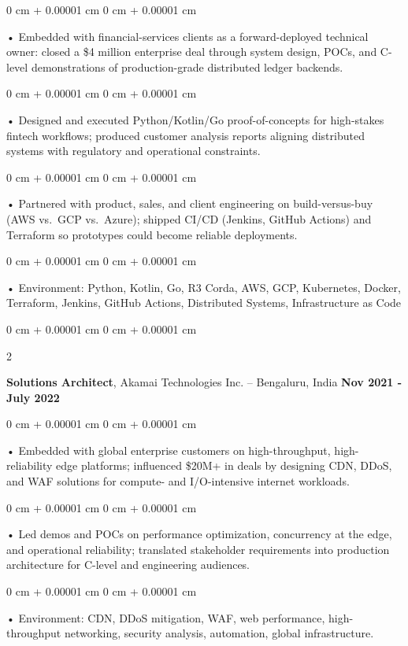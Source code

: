 \documentclass[10pt, letterpaper]{article}
\newenvironment{onecolentry}{
    \begin{adjustwidth}{
        0 cm + 0.00001 cm
    }{
        0 cm + 0.00001 cm
    }
}{
    \end{adjustwidth}
} %
\newenvironment{twocolentry}[2][]{
    \onecolentry
    \def\secondColumn{#2}
    \setcolumnwidth{\fill, 4.5 cm}
    \begin{paracol}{2}
}{
    \switchcolumn \raggedleft \secondColumn
    \end{paracol}
    \endonecolentry
} %
\begin{document}
        \begin{onecolentry}
             • Embedded with financial-services clients as a forward-deployed technical owner: closed a \$4 million enterprise deal through system design, POCs, and C-level demonstrations of production-grade distributed ledger backends.
        \end{onecolentry}
        \begin{onecolentry}
             • Designed and executed Python/Kotlin/Go proof-of-concepts for high-stakes fintech workflows; produced customer analysis reports aligning distributed systems with regulatory and operational constraints.
        \end{onecolentry}
        \begin{onecolentry}
             • Partnered with product, sales, and client engineering on build-versus-buy (AWS vs.\ GCP vs.\ Azure); shipped CI/CD (Jenkins, GitHub Actions) and Terraform so prototypes could become reliable deployments.
        \end{onecolentry}
        \begin{onecolentry}
             • Environment: Python, Kotlin, Go, R3 Corda, AWS, GCP, Kubernetes, Docker, Terraform, Jenkins, GitHub Actions, Distributed Systems, Infrastructure as Code
        \end{onecolentry}
        \vspace{0.1cm}

        \begin{twocolentry}{
            \textbf{Nov 2021 - July 2022}
        }
            \textbf{Solutions Architect}, Akamai Technologies Inc. -- Bengaluru, India \end{twocolentry}
        \begin{onecolentry}
            • Embedded with global enterprise customers on high-throughput, high-reliability edge platforms; influenced \$20M+ in deals by designing CDN, DDoS, and WAF solutions for compute- and I/O-intensive internet workloads.
        \end{onecolentry}
        \begin{onecolentry}
            • Led demos and POCs on performance optimization, concurrency at the edge, and operational reliability; translated stakeholder requirements into production architecture for C-level and engineering audiences.
        \end{onecolentry}
        \begin{onecolentry}
             • Environment: CDN, DDoS mitigation, WAF, web performance, high-throughput networking, security analysis, automation, global infrastructure.
        \end{onecolentry}
\end{document}

